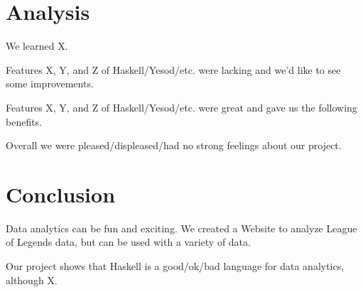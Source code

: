 \documentclass{chi2009}
\begin{document}
\section{Analysis}
\label{analysis}

We learned X.

Features X, Y, and Z of Haskell/Yesod/etc. were lacking and we'd like to see some improvements.

Features X, Y, and Z of Haskell/Yesod/etc. were great and gave us the following benefits.

Overall we were pleased/displeased/had no strong feelings about our project.

\section{Conclusion}
\label{conclusion}

Data analytics can be fun and exciting. We created a Website to analyze League of Legends data, but can be used with a variety of data.

Our project shows that Haskell is a good/ok/bad language for data analytics, although X. 



\end{document}
